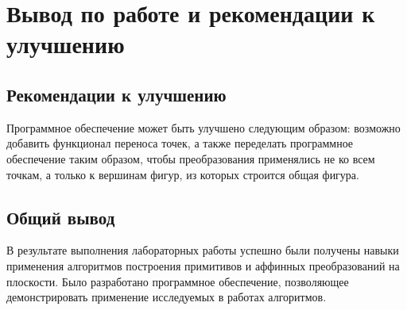 \documentclass[document.tex]{subfiles}
\begin{document}
\section{Вывод по работе и рекомендации к улучшению}
\subsection{Рекомендации к улучшению}
Программное обеспечение может быть улучшено
следующим образом: возможно добавить функционал переноса точек, а также
переделать программное обеспечение таким образом, чтобы преобразования
применялись не ко всем точкам, а только к вершинам фигур, из которых строится
общая фигура.
\subsection{Общий вывод}
В результате выполнения лабораторных работы успешно были получены навыки
применения алгоритмов построения примитивов и аффинных преобразований на плоскости. Было
разработано программное обеспечение, позволяющее демонстрировать применение
исследуемых в работах алгоритмов. 
\end{document}
